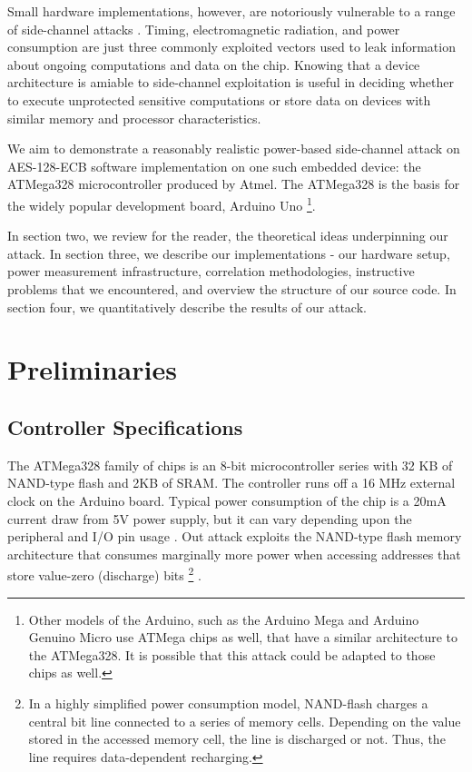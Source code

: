 \documentclass[journal]{ieee_style}
\begin{document}
Small hardware implementations, however, are notoriously vulnerable to a range of side-channel attacks \cite{smalldevice}. Timing, electromagnetic radiation, and power consumption are just three commonly exploited vectors used to leak information about ongoing computations and data on the chip. Knowing that a device architecture is amiable to side-channel exploitation is useful in deciding whether to execute unprotected sensitive computations or store data on devices with similar memory and processor characteristics.

We aim to demonstrate a reasonably realistic power-based side-channel attack on AES-128-ECB software implementation on one such embedded device: the ATMega328 microcontroller produced by Atmel. The ATMega328 is the basis for the widely popular development board, Arduino Uno \footnote{Other models of the Arduino, such as the Arduino Mega and Arduino Genuino Micro use ATMega chips as well, that have a similar architecture to the ATMega328. It is possible that this attack could be adapted to those chips as well.}.

In section two, we review for the reader, the theoretical ideas underpinning our attack. In section three, we describe our implementations - our hardware setup, power measurement infrastructure, correlation methodologies, instructive problems that we encountered, and overview the structure of our source code. In section four, we quantitatively describe the results of our attack.

\section{Preliminaries}
\subsection{Controller Specifications}
The ATMega328 family of chips is an 8-bit microcontroller series with 32 KB of NAND-type flash and 2KB of SRAM. The controller runs off a 16 MHz external clock on the Arduino board. Typical power consumption of the chip is a 20mA current draw from 5V power supply, but it can vary depending upon the peripheral and I/O pin usage \cite{atmeldatasheet}. Out attack exploits the NAND-type flash memory architecture that consumes marginally more power when accessing addresses that store value-zero (discharge) bits \footnote{In a highly simplified power consumption model, NAND-flash charges a central bit line connected to a series of memory cells. Depending on the value stored in the accessed memory cell, the line is discharged or not. Thus, the line requires data-dependent recharging.} \cite{nandflash}.
\end{document}
